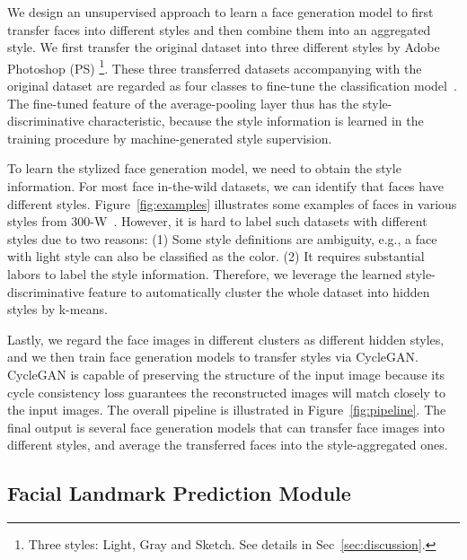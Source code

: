 \documentclass[10pt,twocolumn,letterpaper]{article}
\begin{document}
We design an unsupervised approach to learn a face generation model to first transfer faces into different styles and then combine them into an aggregated style.
We first transfer the original dataset into three different styles by Adobe Photoshop (PS)
\footnote{Three styles: Light, Gray and Sketch. See details in Sec~\ref{sec:discussion}.}.
These three transferred datasets accompanying with the original dataset are regarded as four classes to fine-tune the classification model~\cite{simonyan2014very,he2016deep,szegedy2015going,dong2017more,yan2016image,xie2017aggregated,huang2017densely}.
The fine-tuned feature of the average-pooling layer thus has the style-discriminative characteristic, because the style information is learned in the training procedure by machine-generated style supervision.


To learn the stylized face generation model, we need to obtain the style information.
For most face in-the-wild datasets, we can identify that faces have different styles.
Figure~\ref{fig:examples} illustrates some examples of faces in various styles from 300-W~\cite{sagonas2013300}.
However, it is hard to label such datasets with different styles due to two reasons:
(1) Some style definitions are ambiguity, e.g., a face with light style can also be classified as the color.
(2) It requires substantial labors to label the style information.
Therefore, we leverage the learned style-discriminative feature to automatically cluster the whole dataset into  hidden styles by k-means.


Lastly, we regard the face images in different clusters as different hidden styles, and we then train face generation models to transfer styles via CycleGAN.
CycleGAN is capable of preserving the structure of the input image because its cycle consistency loss guarantees the reconstructed images will match closely to the input images.
The overall pipeline is illustrated in Figure~\ref{fig:pipeline}.
The final output is several face generation models that can transfer face images into different styles, and average the transferred faces into the style-aggregated ones.


\subsection{Facial Landmark Prediction Module}\label{sec:prediction-module}
\end{document}
